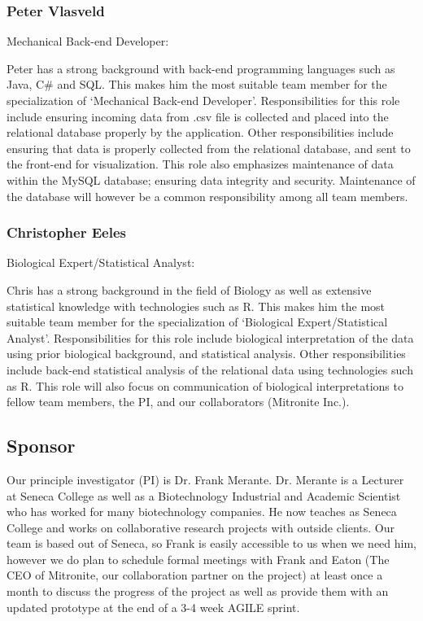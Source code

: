 \documentclass[10pt,twocolumn,letterpaper]{article}
\begin{document}
                \subsubsection*{Peter Vlasveld}

                Mechanical Back-end Developer:

		Peter has a strong background with back-end programming languages such as Java, C# and SQL.
		This makes him the most suitable team member for the specialization of `Mechanical Back-end Developer'.
		Responsibilities for this role include ensuring incoming data from .csv file is collected and placed into 
		the relational database properly by the application.
		Other responsibilities include ensuring that data is properly collected from the relational database, and sent to the front-end for visualization.
		This role also emphasizes maintenance of data within the MySQL database; ensuring data integrity and security.
		Maintenance of the database will however be a common responsibility among all team members.

                \subsubsection*{Christopher Eeles}

                Biological Expert/Statistical Analyst:
		
		Chris has a strong background in the field of Biology as well as extensive statistical knowledge with technologies such as R.
		This makes him the most suitable team member for the specialization of `Biological Expert/Statistical Analyst'.
		Responsibilities for this role include biological interpretation of the data using prior biological background, and statistical analysis.
		Other responsibilities include back-end statistical analysis of the relational data using technologies such as R.
		This role will also focus on communication of biological interpretations to fellow team members, the PI, and our collaborators (Mitronite Inc.).	
		

        \subsection{Sponsor}

	Our principle investigator (PI) is Dr. Frank Merante. 
	Dr. Merante is a Lecturer at Seneca College as well as a Biotechnology Industrial and Academic Scientist who has worked for many biotechnology companies.
	He now teaches as Seneca College and works on collaborative research projects with outside clients. 
	Our team is based out of Seneca, so Frank is easily accessible to us when we need him, however we do plan to schedule formal meetings with Frank and Eaton (The CEO of
	Mitronite, our collaboration partner on the project) at least once a month to discuss the progress of the project as well as provide them with an updated prototype at the
	end of a 3-4 week AGILE sprint.
		
\end{document}
